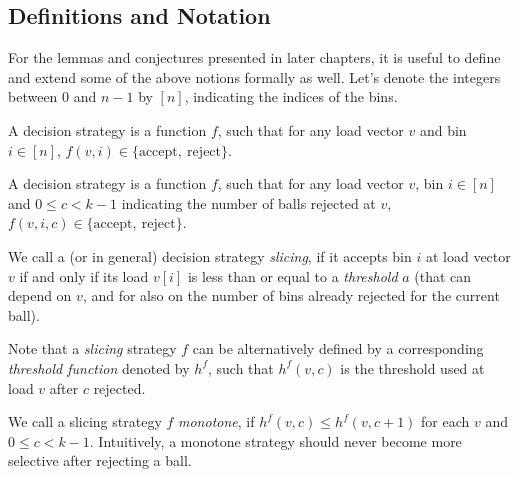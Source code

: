 \subsection{Definitions and Notation} \label{notation}

For the lemmas and conjectures presented in later chapters, it is useful to define and extend some of the above notions formally as well. Let's denote the integers between $0$ and $n-1$ by $[n]$, indicating the indices of the bins.


\begin{definition} 
A \TwoThinning decision strategy is a function $f$, such that for any load vector $v$ and bin $i\in[n]$, $f(v, i)\in\{\mathrm{accept},\ \mathrm{reject}\}$.
\end{definition}


\begin{definition} 
A \KThinning decision strategy is a function $f$, such that for any load vector $v$, bin $i\in[n]$ and $0\leq c<k-1$ indicating the number of balls rejected at $v$, $f(v, i, c)\in\{\mathrm{accept},\ \mathrm{reject}\}$.
\end{definition}


\begin{definition} 
We call a \TwoThinning (or \KThinning in general) decision strategy \textit{slicing}, if it accepts bin $i$ at load vector $v$ if and only if its load $v[i]$ is less than or equal to a \textit{threshold} $a$ (that can depend on $v$, and for \KThinning also on the number of bins already rejected for the current ball).
\end{definition}


\begin{definition} 
Note that a \KThinning \textit{slicing} strategy $f$ can be alternatively defined by a corresponding \textit{threshold function} denoted by $h^f$, such that $h^f(v,c)$ is the threshold used at load $v$ after $c$  rejected.
\end{definition}



\begin{definition} 
We call a \KThinning slicing strategy $f$ \textit{monotone}, if $h^f(v,c)\leq h^f(v,c+1)$ for each $v$ and $0\leq c<k-1$. Intuitively, a monotone strategy should never become more selective after rejecting a ball.
\end{definition}


